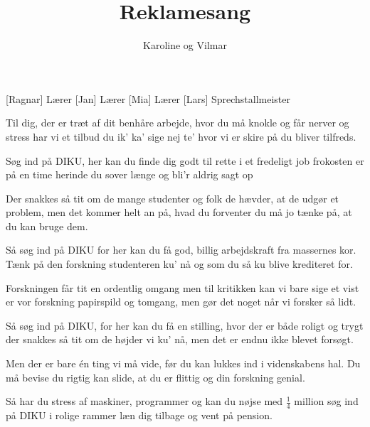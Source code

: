 \documentclass[a4paper,11pt]{article}
\title{Reklamesang}
\author{Karoline og Vilmar}
\begin{document}
\maketitle

\begin{roles}
[Ragnar] Lærer
[Jan] Lærer
[Mia] Lærer
[Lars] Sprechstallmeister
\end{roles}

\begin{sketch}


\end{sketch}

\begin{song}
Til dig, der er træt af dit benhåre arbejde,
hvor du må knokle og får nerver og stress
har vi et tilbud du ik' ka' sige nej te'
hvor vi er skire på du bliver tilfreds.


Søg ind på DIKU, her kan du finde
dig godt til rette i et fredeligt job
frokosten er på en time herinde
du sover længe og bli'r aldrig sagt op


Der snakkes så tit om de mange studenter
og folk de hævder, at de udgør et problem,
men det kommer helt an på, hvad du forventer
du må jo tænke på, at du kan bruge dem.

Så søg ind på DIKU for her kan du få
god, billig arbejdskraft fra massernes kor.
Tænk på den forskning studenteren ku' nå
og som du så ku blive krediteret for.

Forskningen får tit en ordentlig omgang
men til kritikken kan vi bare sige et
vist er vor forskning papirspild og tomgang,
men gør det noget når vi forsker så lidt.

Så søg ind på DIKU, for her kan du få
en stilling, hvor der er både roligt og trygt
der snakkes så tit om de højder vi ku' nå,
men det er endnu ikke blevet forsøgt.

Men der er bare én ting vi må vide,
før du kan lukkes ind i videnskabens hal.
Du må bevise du rigtig kan slide,
at du er flittig og din forskning genial.

Så har du stress af maskiner, programmer
og kan du nøjse med $\frac{1}{4}$ million
søg ind på DIKU i rolige rammer
læn dig tilbage og vent på pension.
\end{song}
\end{document}
